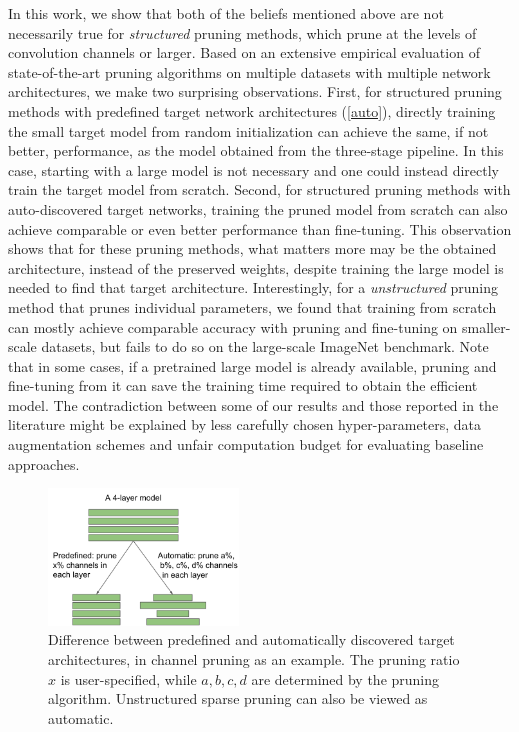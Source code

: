 In this work, we show that both of the beliefs mentioned above are not necessarily true for \emph{structured} pruning methods, which prune at the levels of convolution channels or larger. Based on an extensive empirical evaluation of state-of-the-art pruning algorithms on multiple datasets with multiple network architectures, we make two surprising observations. First, for structured pruning methods with predefined target network architectures (\autoref{auto}), directly training the small target model from random initialization can achieve the same, if not better, performance, as the model obtained from the three-stage pipeline.
In this case, starting with a large model is not necessary and one could instead directly train the target model from scratch.
Second, for structured pruning methods with auto-discovered target networks, training the pruned model from scratch can also achieve comparable or even better performance than fine-tuning. This observation shows that for these pruning methods, what matters more may be the obtained architecture, instead of the preserved weights, despite training the large model is needed to find that target architecture. 
Interestingly, for a \emph{unstructured} pruning method \citep{han2015learning} that prunes individual parameters, we found that training from scratch can mostly achieve comparable accuracy with pruning and fine-tuning on smaller-scale datasets, but fails to do so on the large-scale ImageNet benchmark.
Note that in some cases, if a pretrained large model is already available, pruning and fine-tuning from it can save the training time required to obtain the efficient model.
The contradiction between some of our results and those reported in the literature might be explained by less carefully chosen hyper-parameters, data augmentation schemes and unfair computation budget for evaluating baseline approaches.

\begin{figure}
    \vspace{-18pt}
  \begin{center}
    \includegraphics[width=0.45\textwidth]{figures/auto-crop.pdf}
  \end{center}
\caption{Difference between predefined and automatically discovered target architectures, in channel pruning as an example. The pruning ratio $x$ is user-specified, while $a, b, c, d$ are determined by the pruning algorithm. Unstructured sparse pruning can also be viewed as automatic.} 
    \label{auto}
    \vspace{-13pt}

\end{figure}


